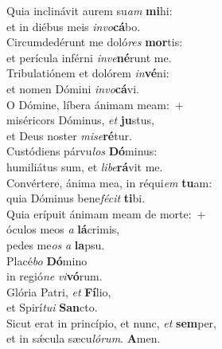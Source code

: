 \evenverse Quia inclinávit aurem su\textit{am} \textbf{mi}hi:~\*\\
\evenverse et in diébus meis \textit{in}\textit{vo}\textbf{cá}bo.\\
\oddverse Circumdedérunt me doló\textit{res} \textbf{mor}tis:~\*\\
\oddverse et perícula inférni \textit{in}\textit{ve}\textbf{né}runt me.\\
\evenverse Tribulatiónem et dolórem \textit{in}\textbf{vé}ni:~\*\\
\evenverse et nomen Dómini \textit{in}\textit{vo}\textbf{cá}vi.\\
\oddverse O Dómine, líbera ánimam meam:~+\\
\oddverse  miséricors Dóminus, \textit{et} \textbf{ju}stus,~\*\\
\oddverse et Deus noster \textit{mi}\textit{se}\textbf{ré}tur.\\
\evenverse Custódiens párvu\textit{los} \textbf{Dó}minus:~\*\\
\evenverse humiliátus sum, et \textit{li}\textit{be}\textbf{rá}vit me.\\
\oddverse Convértere, ánima mea, in réqui\textit{em} \textbf{tu}am:~\*\\
\oddverse quia Dóminus bene\textit{fé}\textit{cit} \textbf{ti}bi.\\
\evenverse Quia erípuit ánimam meam de morte:~+\\
\evenverse  óculos meos \textit{a} \textbf{lá}crimis,~\*\\
\evenverse pedes me\textit{os} \textit{a} \textbf{la}psu.\\
\oddverse Placé\textit{bo} \textbf{Dó}mino~\*\\
\oddverse in regió\textit{ne} \textit{vi}\textbf{vó}rum.\\
\evenverse Glória Patri, \textit{et} \textbf{Fí}lio,~\*\\
\evenverse et Spirí\textit{tu}\textit{i} \textbf{San}cto.\\
\oddverse Sicut erat in princípio, et nunc, \textit{et} \textbf{sem}per,~\*\\
\oddverse et in sǽcula sæcu\textit{ló}\textit{rum}. \textbf{A}men.\\
